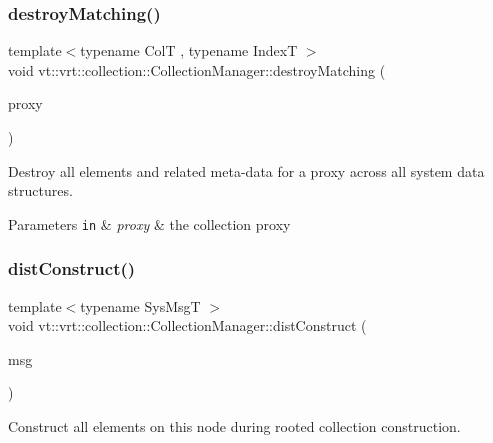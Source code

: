 \subsubsection{\texorpdfstring{destroy\+Matching()}{destroyMatching()}}
{\footnotesize\ttfamily template$<$typename ColT , typename IndexT $>$ \\
void vt\+::vrt\+::collection\+::\+Collection\+Manager\+::destroy\+Matching (\begin{DoxyParamCaption}\item[{\hyperlink{structvt_1_1vrt_1_1collection_1_1_collection_manager_a56458ed7f9bb22b631b9b3a745f42f94}{Collection\+Proxy\+Wrap\+Type}$<$ ColT, IndexT $>$ const \&}]{proxy }\end{DoxyParamCaption})\hspace{0.3cm}{\ttfamily [private]}}



Destroy all elements and related meta-\/data for a proxy across all system data structures. 


\begin{DoxyParams}[1]{Parameters}
\mbox{\tt in}  & {\em proxy} & the collection proxy \\
\hline
\end{DoxyParams}
\mbox{\label{structvt_1_1vrt_1_1collection_1_1_collection_manager_ab82abba567a08d19a26618fe7c65452e}} 
\subsubsection{\texorpdfstring{dist\+Construct()}{distConstruct()}}
{\footnotesize\ttfamily template$<$typename Sys\+MsgT $>$ \\
void vt\+::vrt\+::collection\+::\+Collection\+Manager\+::dist\+Construct (\begin{DoxyParamCaption}\item[{Sys\+MsgT $\ast$}]{msg }\end{DoxyParamCaption})\hspace{0.3cm}{\ttfamily [static]}}



Construct all elements on this node during rooted collection construction. 


